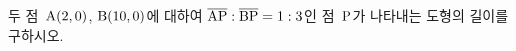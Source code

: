 두 점~$\mathrm{A}(2{,}\mkern3mu\mathopen{}0)$, $\mathrm{B}(10{,}\mkern3mu\mathopen{}0)$에 대하여 $\overline{\mathrm{AP}}:\overline{\mathrm{BP}}=1:3$인 점~$\mathrm{P}$가 나타내는 도형의 길이를 구하시오.
